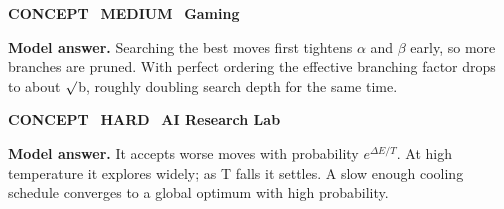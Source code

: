 \documentclass[11pt]{article}
\begin{document}
\begin{tcolorbox}[enhanced,breakable,colback=white,colframe=teal,arc=2mm,boxrule=0.8pt,left=3mm,right=3mm,
 title={\textbf{QII.04}\quad How does move ordering affect alpha--beta pruning?},fonttitle=\color{white}\small,colbacktitle=teal]
\colorbox{teal!15}{\scriptsize\bfseries\color{teal} CONCEPT}\
\colorbox{gold!85!black!15}{\scriptsize\bfseries\color{gold!85!black} MEDIUM}\
\colorbox{navy!8}{\scriptsize\bfseries\color{navy} Gaming}\par\smallskip
\textbf{\color{navy}Model answer.} Searching the best moves first tightens $\alpha$ and $\beta$ early, so more branches are pruned. With perfect ordering the effective branching factor drops to about $\surd$b, roughly doubling search depth for the same time.
\end{tcolorbox}
\begin{tcolorbox}[enhanced,breakable,colback=white,colframe=teal,arc=2mm,boxrule=0.8pt,left=3mm,right=3mm,
 title={\textbf{QII.05}\quad Why does simulated annealing escape local optima while hill climbing does not?},fonttitle=\color{white}\small,colbacktitle=teal]
\colorbox{teal!15}{\scriptsize\bfseries\color{teal} CONCEPT}\
\colorbox{crimson!15}{\scriptsize\bfseries\color{crimson} HARD}\
\colorbox{navy!8}{\scriptsize\bfseries\color{navy} AI Research Lab}\par\smallskip
\textbf{\color{navy}Model answer.} It accepts worse moves with probability $e^{\Delta E/T}$. At high temperature it explores widely; as T falls it settles. A slow enough cooling schedule converges to a global optimum with high probability.
\end{tcolorbox}
\end{document}
